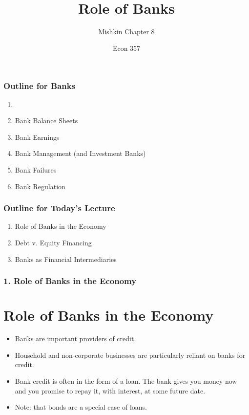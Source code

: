 \documentclass{beamer}
\title{Role of Banks}
\subtitle{Mishkin Chapter 8}
\author{Econ 357}
\date{\week}
\begin{document}
\frame{\titlepage}

\begin{frame}
    \frametitle{Outline for Banks}
        \begin{enumerate}
            \item {}
            \item Bank Balance Sheets
            \item Bank Earnings
            \item Bank Management (and Investment Banks)
            \item Bank Failures
            \item Bank Regulation
        \end{enumerate}
\end{frame}


\begin{frame}
    \frametitle{Outline for Today's Lecture}
    \begin{enumerate}
        \item Role of Banks in the Economy
        \item Debt v. Equity Financing
        \item Banks as Financial Intermediaries
    \end{enumerate}

\end{frame}

\begin{frame}[t]
    \frametitle{1. Role of Banks in the Economy}
    \section{Role of Banks in the Economy}

    \begin{itemize}
        \item Banks are important providers of credit.
        \item Household and non-corporate businesses are particularly reliant on banks for credit.
        \item Bank credit is often in the form of a loan.   The bank gives you money now and you promise to repay it, with interest, at some future date.
        \item Note: that bonds are a special case of loans.  
    \end{itemize}

\end{frame}
\end{document}
